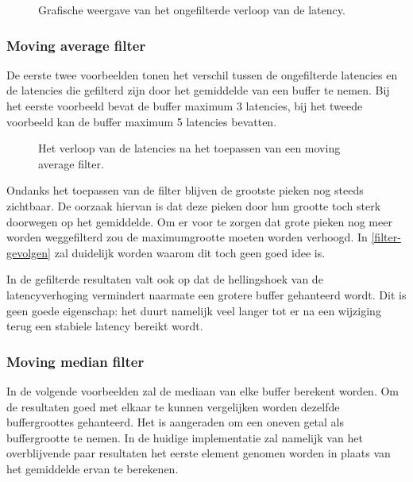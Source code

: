 \begin{figure}[h!]
	\captionsetup{width=0.7\textwidth}
	\caption[Het ongefilterde verloop van de latency]{Grafische weergave van het ongefilterde verloop van de latency.}
	\begin{center}
		\advance\parskip0.3cm
		
	\end{center}
	\label{latencydata}
\end{figure}

\subsubsection{Moving average filter}

De eerste twee voorbeelden tonen het verschil tussen de ongefilterde latencies en de latencies die gefilterd zijn door het gemiddelde van een buffer te nemen. Bij het eerste voorbeeld bevat de buffer maximum 3 latencies, bij het tweede voorbeeld kan de buffer maximum 5 latencies bevatten.

\begin{figure}[!tbph]
	\centering
	\subfloat[Buffergrootte 3]{}
	\hfill
	\subfloat[Buffergrootte 5]{}
	\captionsetup{width=0.7\textwidth}
	\caption{Het verloop van de latencies na het toepassen van een moving average filter.}
\end{figure}

Ondanks het toepassen van de filter blijven de grootste pieken nog steeds zichtbaar. De oorzaak hiervan is dat deze pieken door hun grootte toch sterk doorwegen op het gemiddelde. Om er voor te zorgen dat grote pieken nog meer worden weggefilterd zou de maximumgrootte moeten worden verhoogd. In \ref{filter-gevolgen} zal duidelijk worden waarom dit toch geen goed idee is.

In de gefilterde resultaten valt ook op dat de hellingshoek van de latencyverhoging vermindert naarmate een grotere buffer gehanteerd wordt. Dit is geen goede eigenschap: het duurt namelijk veel langer tot er na een wijziging terug een stabiele latency bereikt wordt.

\subsubsection{Moving median filter}

In de volgende voorbeelden zal de mediaan van elke buffer berekent worden. Om de resultaten goed met elkaar te kunnen vergelijken worden dezelfde buffergroottes gehanteerd. Het is aangeraden om een oneven getal als buffergrootte te nemen. In de huidige implementatie zal namelijk van het overblijvende paar resultaten het eerste element genomen worden in plaats van het gemiddelde ervan te berekenen.

